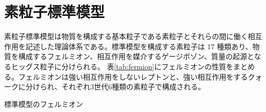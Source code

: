 \section{素粒子標準模型}
\label{sec_intro_sm}
素粒子標準模型は物質を構成する基本粒子である素粒子とそれらの間に働く相互作用を記述した理論体系である。標準模型を構成する素粒子は 17 種類あり、物質を構成するフェルミオン、相互作用を媒介するゲージボゾン、質量の起源となるヒッグス粒子に分けられる。
表\ref{tab:fermion}にフェルミオンの性質をまとめる。フェルミオンは強い相互作用をしないレプトンと、強い相互作用をするクォークに分けられ、それぞれ3世代6種類の素粒子で構成される。
\begin{table}[]
    \centering
    \caption[標準模型のフェルミオン]{標準模型のフェルミオン}
    \label{tab:fermion}


\end{table}
